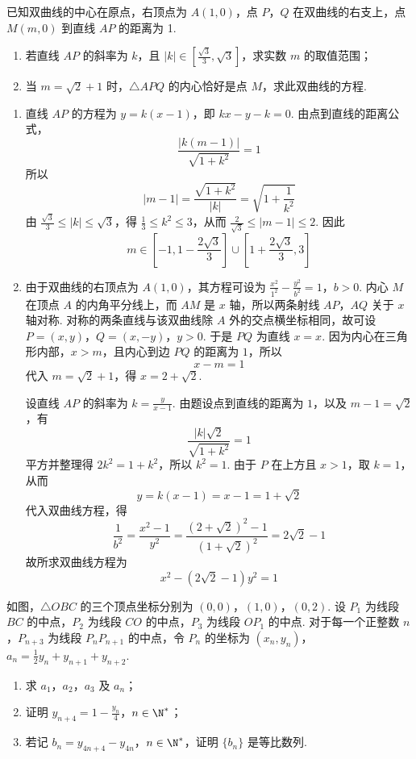 \begin{problem}
已知双曲线的中心在原点，右顶点为 \(A(1,0)\)，点 \(P\)，\(Q\) 在双曲线的右支上，点 \(M(m,0)\) 到直线 \(AP\) 的距离为 1.
\begin{enumerate}
\item 若直线 \(AP\) 的斜率为 \(k\)，且 \(\left|k\right| \in \left[\frac{\sqrt{3}}{3}, \sqrt{3}\right]\)，求实数 \(m\) 的取值范围；
\item 当 \(m=\sqrt{2}+1\) 时，\(\triangle APQ\) 的内心恰好是点 \(M\)，求此双曲线的方程.
\end{enumerate}
\end{problem}

\begin{solution}
\begin{enumerate}
\item 直线 \(AP\) 的方程为 \(y=k(x-1)\)，即 \(kx-y-k=0\). 由点到直线的距离公式，
\[
\frac{|k(m-1)|}{\sqrt{1+k^2}}=1
\]
所以
\[
|m-1|=\frac{\sqrt{1+k^2}}{|k|}=\sqrt{1+\frac1{k^2}}
\]
由 \(\frac{\sqrt3}{3}\leqslant|k|\leqslant\sqrt3\)，得
\(\frac13\leqslant k^2\leqslant3\)，从而
\(\frac{2}{\sqrt3}\leqslant|m-1|\leqslant2\). 因此
\[
m\in\left[-1,1-\frac{2\sqrt3}{3}\right]\cup\left[1+\frac{2\sqrt3}{3},3\right]
\]
\item 由于双曲线的右顶点为 \(A(1,0)\)，其方程可设为
\(\frac{x^2}{1^2}-\frac{y^2}{b^2}=1\)，\(b>0\).
内心 \(M\) 在顶点 \(A\) 的内角平分线上，而 \(AM\) 是 \(x\) 轴，所以两条射线 \(AP\)，\(AQ\) 关于 \(x\) 轴对称. 对称的两条直线与该双曲线除 \(A\) 外的交点横坐标相同，故可设
\(P=(x,y)\)，\(Q=(x,-y)\)，\(y>0\).
于是 \(PQ\) 为直线 \(x=x\). 因为内心在三角形内部，\(x>m\)，且内心到边 \(PQ\) 的距离为 \(1\)，所以
\[
x-m=1
\]
代入 \(m=\sqrt2+1\)，得 \(x=2+\sqrt2\).

设直线 \(AP\) 的斜率为 \(k=\frac{y}{x-1}\). 由题设点到直线的距离为 \(1\)，以及 \(m-1=\sqrt2\)，有
\[
\frac{|k|\sqrt2}{\sqrt{1+k^2}}=1
\]
平方并整理得 \(2k^2=1+k^2\)，所以 \(k^2=1\). 由于 \(P\) 在上方且 \(x>1\)，取 \(k=1\)，从而
\[
y=k(x-1)=x-1=1+\sqrt2
\]
代入双曲线方程，得
\[
\frac1{b^2}=\frac{x^2-1}{y^2}
=\frac{(2+\sqrt2)^2-1}{(1+\sqrt2)^2}
=2\sqrt2-1
\]
故所求双曲线方程为
\[
x^2-(2\sqrt2-1)y^2=1
\]
\end{enumerate}
\end{solution}

\begin{problem}
如图，\(\triangle OBC\) 的三个顶点坐标分别为 \((0,0)\)，\((1,0)\)，\((0,2)\). 设 \(P_{1}\) 为线段 \(BC\) 的中点，\(P_{2}\) 为线段 \(CO\) 的中点，\(P_{3}\) 为线段 \(OP_{1}\) 的中点. 对于每一个正整数 \(n\)，\(P_{n+3}\) 为线段 \(P_{n}P_{n+1}\) 的中点，令 \(P_{n}\) 的坐标为 \((x_{n}, y_{n})\)，\(a_{n} = \frac{1}{2}y_{n} + y_{n+1} + y_{n+2}\).
\begin{enumerate}
\item 求 \(a_{1}\)，\(a_{2}\)，\(a_{3}\) 及 \(a_{n}\)；
\item 证明 \(y_{n+4} = 1 - \frac{y_n}{4}\)，\(n \in \N^*\)；
\item 若记 \(b_{n} = y_{4n+4} - y_{4n}\)，\(n \in \N^*\)，证明 \(\{b_n\}\) 是等比数列.
\end{enumerate}

\end{problem}

